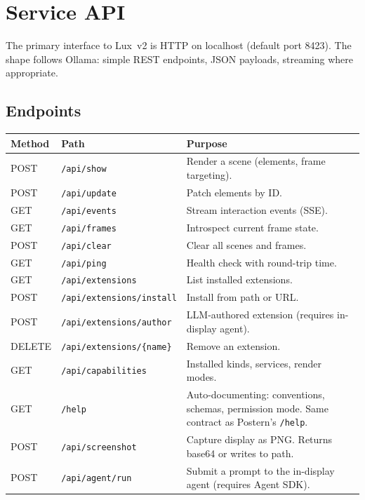 \documentclass[a4paper,10pt]{article}
\newcommand{\api}[1]{\texttt{#1}}
\begin{document}
\section{Service API}

The primary interface to Lux~v2 is HTTP on localhost (default port
8423).  The shape follows Ollama: simple REST endpoints, JSON
payloads, streaming where appropriate.

\subsection{Endpoints}

\begin{center}
\begin{tabularx}{\linewidth}{@{}llX@{}}
\toprule
\textbf{Method} & \textbf{Path} & \textbf{Purpose} \\
\midrule
POST & \api{/api/show}      & Render a scene (elements, frame
  targeting). \\
POST & \api{/api/update}    & Patch elements by ID. \\
GET  & \api{/api/events}    & Stream interaction events (SSE). \\
GET  & \api{/api/frames}    & Introspect current frame state. \\
POST & \api{/api/clear}     & Clear all scenes and frames. \\
GET  & \api{/api/ping}      & Health check with round-trip time. \\
\midrule
GET  & \api{/api/extensions}          & List installed extensions. \\
POST & \api{/api/extensions/install}  & Install from path or URL. \\
POST & \api{/api/extensions/author}   & LLM-authored extension
  (requires in-display agent). \\
DELETE & \api{/api/extensions/\{name\}} & Remove an extension. \\
\midrule
GET  & \api{/api/capabilities} & Installed kinds, services,
  render modes. \\
GET  & \api{/help}           & Auto-documenting: conventions,
  schemas, permission mode.  Same contract as
  Postern's \api{/help}. \\
\midrule
POST & \api{/api/screenshot} & Capture display as PNG.  Returns
  base64 or writes to path. \\
POST & \api{/api/agent/run}  & Submit a prompt to the in-display
  agent (requires Agent SDK). \\
\bottomrule
\end{tabularx}
\end{center}
\end{document}
